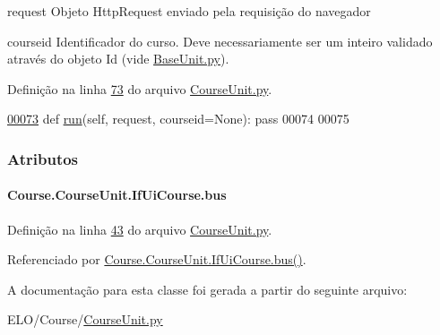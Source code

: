 \begin{DoxyItemize}
\item request Objeto Http\+Request enviado pela requisição do navegador\end{DoxyItemize}
\begin{DoxyItemize}
\item courseid Identificador do curso. Deve necessariamente ser um inteiro validado através do objeto Id (vide \hyperlink{BaseUnit_8py}{Base\+Unit.\+py}). \end{DoxyItemize}


Definição na linha \hyperlink{CourseUnit_8py_source_l00073}{73} do arquivo \hyperlink{CourseUnit_8py_source}{Course\+Unit.\+py}.


\begin{DoxyCode}
\hypertarget{classCourse_1_1CourseUnit_1_1IfUiCourse_l00073}{}\hyperlink{classCourse_1_1CourseUnit_1_1IfUiCourse_a5b174a0ca1e8fec0bb322d518c6b9cbe}{00073}     \textcolor{keyword}{def }\hyperlink{classCourse_1_1CourseUnit_1_1IfUiCourse_a5b174a0ca1e8fec0bb322d518c6b9cbe}{run}(self, request, courseid=None): \textcolor{keyword}{pass}
00074 
00075 
\end{DoxyCode}


\subsubsection{Atributos}
\hypertarget{classCourse_1_1CourseUnit_1_1IfUiCourse_a228fc709b99da3a7e6f5020bd07cee03}{}
\paragraph[{bus}]{\setlength{\rightskip}{0pt plus 5cm}Course.\+Course\+Unit.\+If\+Ui\+Course.\+bus}\label{classCourse_1_1CourseUnit_1_1IfUiCourse_a228fc709b99da3a7e6f5020bd07cee03}


Definição na linha \hyperlink{CourseUnit_8py_source_l00043}{43} do arquivo \hyperlink{CourseUnit_8py_source}{Course\+Unit.\+py}.



Referenciado por \hyperlink{classCourse_1_1CourseUnit_1_1IfUiCourse_af9f448bf861939bd039faed2f82de324}{Course.\+Course\+Unit.\+If\+Ui\+Course.\+bus()}.



A documentação para esta classe foi gerada a partir do seguinte arquivo\+:\begin{DoxyCompactItemize}
\item 
E\+L\+O/\+Course/\hyperlink{CourseUnit_8py}{Course\+Unit.\+py}\end{DoxyCompactItemize}
